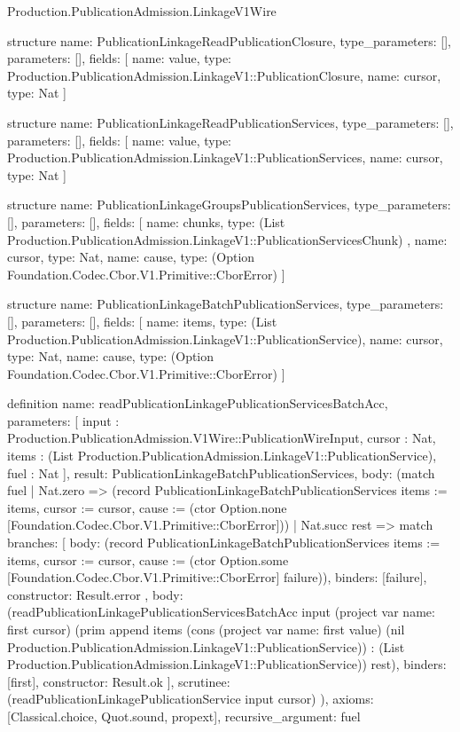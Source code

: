 \begin{lexlean}{Production.PublicationAdmission.LinkageV1Wire}
\begin{semanticmodule}
structure{
  name: PublicationLinkageReadPublicationClosure,
  type_parameters: [],
  parameters: [],
  fields: [
    {name: value, type: Production.PublicationAdmission.LinkageV1::PublicationClosure},
    {name: cursor, type: Nat}
  ]
}

structure{
  name: PublicationLinkageReadPublicationServices,
  type_parameters: [],
  parameters: [],
  fields: [
    {name: value, type: Production.PublicationAdmission.LinkageV1::PublicationServices},
    {name: cursor, type: Nat}
  ]
}

structure{
  name: PublicationLinkageGroupsPublicationServices,
  type_parameters: [],
  parameters: [],
  fields: [
    {
      name: chunks,
      type: (List Production.PublicationAdmission.LinkageV1::PublicationServicesChunk)
    },
    {name: cursor, type: Nat},
    {name: cause, type: (Option Foundation.Codec.Cbor.V1.Primitive::CborError)}
  ]
}

structure{
  name: PublicationLinkageBatchPublicationServices,
  type_parameters: [],
  parameters: [],
  fields: [
    {name: items, type: (List Production.PublicationAdmission.LinkageV1::PublicationService)},
    {name: cursor, type: Nat},
    {name: cause, type: (Option Foundation.Codec.Cbor.V1.Primitive::CborError)}
  ]
}

definition{
  name: readPublicationLinkagePublicationServicesBatchAcc,
  parameters: [
    input : Production.PublicationAdmission.V1Wire::PublicationWireInput,
    cursor : Nat,
    items : (List Production.PublicationAdmission.LinkageV1::PublicationService),
    fuel : Nat
  ],
  result: PublicationLinkageBatchPublicationServices,
  body: (match fuel
    | Nat.zero => (record PublicationLinkageBatchPublicationServices {items := items, cursor := cursor, cause := (ctor Option.none [Foundation.Codec.Cbor.V1.Primitive::CborError])})
    | Nat.succ rest => match{
      branches: [
        {
          body: (record PublicationLinkageBatchPublicationServices {items := items, cursor := cursor, cause := (ctor Option.some [Foundation.Codec.Cbor.V1.Primitive::CborError] failure)}),
          binders: [failure],
          constructor: Result.error
        },
        {
          body: (readPublicationLinkagePublicationServicesBatchAcc input (project var{
            name: first
          } cursor) (prim append items (cons (project var{
            name: first
          } value) (nil Production.PublicationAdmission.LinkageV1::PublicationService)) : (List Production.PublicationAdmission.LinkageV1::PublicationService)) rest),
          binders: [first],
          constructor: Result.ok
        }
      ],
      scrutinee: (readPublicationLinkagePublicationService input cursor)
    }),
  axioms: [Classical.choice, Quot.sound, propext],
  recursive_argument: fuel
}


\end{semanticmodule}
\end{lexlean}

